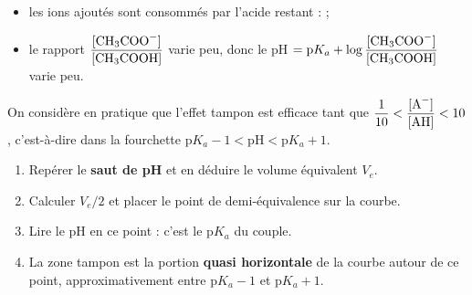 \documentclass[11pt]{article}
\begin{document}
\begin{itemize}
\item les ions  ajoutés sont consommés par l'acide restant :  ;
\item le rapport $\dfrac{[\ce{CH3COO-}]}{[\ce{CH3COOH}]}$ varie peu, donc le pH $= \text{p}K_a + \log\dfrac{[\ce{CH3COO-}]}{[\ce{CH3COOH}]}$ varie peu.
\end{itemize}

On considère en pratique que l'effet tampon est efficace tant que $\dfrac{1}{10} < \dfrac{[\ce{A-}]}{[\ce{AH}]} < 10$, c'est-à-dire dans la fourchette $\text{p}K_a - 1 < \text{pH} < \text{p}K_a + 1$.

\begin{methode}
\begin{enumerate}
\item Repérer le \textbf{saut de pH} et en déduire le volume équivalent $V_e$.
\item Calculer $V_e/2$ et placer le point de demi-équivalence sur la courbe.
\item Lire le pH en ce point : c'est le p$K_a$ du couple.
\item La zone tampon est la portion \textbf{quasi horizontale} de la courbe autour de ce point, approximativement entre p$K_a - 1$ et p$K_a + 1$.
\end{enumerate}
\end{methode}
\end{document}
